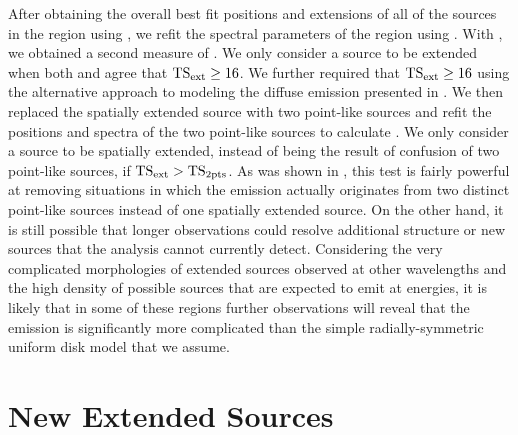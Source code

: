 After obtaining the overall best fit positions and extensions of all
of the sources in the region using \pointlike, we refit the spectral
parameters of the region using \gtlike.  With \gtlike, we obtained a
second measure of \tsext.  We only consider a source to be extended
when both \pointlike and \gtlike agree that $\mathrm{TS}_\mathrm{ext}\ge16$.  We further
required that $\mathrm{TS}_\mathrm{ext}\ge16$ using the alternative approach to modeling
the diffuse emission presented in .
We then replaced the spatially extended source with two point-like sources
and refit the positions and spectra of the two point-like sources to
calculate \tsinc.  We only consider a source to be spatially extended,
instead of being the result of confusion of two point-like sources,
if $\mathrm{TS}_\mathrm{ext}>\mathrm{TS}_{\mathrm{2pts}}$.  As was shown in ,
this test is fairly powerful at removing situations in which the emission
actually originates from two distinct point-like sources instead of one
spatially extended source.  On the other hand, it is still possible that
longer observations could resolve additional structure or new sources that
the analysis cannot currently detect.  Considering the very complicated
morphologies of extended sources observed at other wavelengths and
the high density of possible sources that are expected to emit at \gev
energies, it is likely that in some of these regions further observations
will reveal that the emission is significantly more complicated than
the simple radially-symmetric uniform disk model that we assume.

\section{New Extended Sources}





